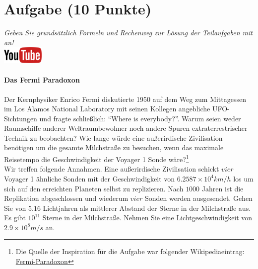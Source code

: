 \documentclass[a4paper, 9pt]{scrartcl}\usepackage[]{graphicx}\usepackage[]{xcolor}
\begin{document}
 
\clearpage

\section{Aufgabe \hfill (10 Punkte)}

\textit{Geben Sie grunds{\"a}tzlich Formeln und Rechenweg zur L{\"o}sung der
  Teilaufgaben mit an!} \\[1Ex]

\hfill\href{https://youtu.be/iCQogS6KhPM}{\includegraphics[width =
  2cm]{img/youtube}} %
\hspace{2Ex}

\paragraph{Das Fermi Paradoxon}



Der Kernphysiker Enrico Fermi diskutierte 1950 auf dem Weg zum Mittagessen
im Los Alamos National Laboratory mit seinen Kollegen angebliche
UFO-Sichtungen und fragte schlie{\ss}lich: "`Where is everybody?"'. Warum seien
weder Raumschiffe anderer Weltraumbewohner noch andere Spuren
extraterrestrischer Technik zu beobachten? Wie lange w{\"u}rde eine au{\ss}erirdische
Zivilisation ben{\"o}tigen um die gesamte Milchstra{\ss}e zu
besuchen, wenn das maximale Reisetempo die Geschwindigkeit der Voyager 1 Sonde w{\"a}re?\footnote{Die Quelle der Inspiration
  für die Aufgabe war folgender Wikipediaeintrag:
  \href{https://de.wikipedia.org/wiki/Fermi-Paradoxon}{Fermi-Paradoxon}}\\[-1ex]

Wir treffen folgende Annahmen. Eine au{\ss}erirdische Zivilisation schickt $vier$
Voyager 1 {\"a}hnliche Sonden mit der Geschwindigkeit von $\ensuremath{6.2587\times 10^{4}}km/h$
los um sich auf den erreichten Planeten selbst zu replizieren. Nach
$1000$ Jahren ist die Replikation abgeschlossen und wiederum
$vier$ Sonden werden ausgesendet. Gehen Sie von
$5.16$ Lichtjahren als mittlerer Abstand der Sterne in der
Milchstra{\ss}e aus. Es gibt $\ensuremath{10^{11}}$ Sterne in der Milchstra{\ss}e. Nehmen
Sie eine Lichtgeschwindigkeit von $\ensuremath{2.9\times 10^{8}}m/s$ an.
\end{document}
